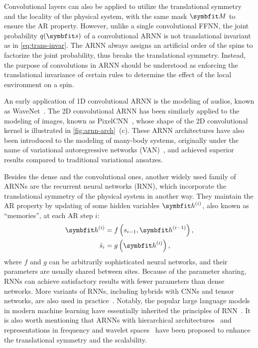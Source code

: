 Convolutional layers can also be applied to utilize the translational symmetry and the locality of the physical system, with the same mask $\mM$ to ensure the AR property. However, unlike a single convolutional FFNN, the joint probability $q(\vs)$ of a convolutional ARNN is not translational invariant as in \cref{eq:trans-invar}. The ARNN always assigns an artificial order of the spins to factorize the joint probability, thus breaks the translational symmetry. Instead, the purpose of convolutions in ARNN should be understood as enforcing the translational invariance of certain rules to determine the effect of the local environment on a spin.

An early application of 1D convolutional ARNN is the modeling of audios, known as WaveNet~\cite{oord2016wavenet}. The 2D convolutional ARNN has been similarly applied to the modeling of images, known as PixelCNN~\cite{oord2016pixel}, whose shape of the 2D convolutional kernel is illustrated in \cref{fig:arnn-arch}~(c). These ARNN architectures have also been introduced to the modeling of many-body systems, originally under the name of variational autoregressive networks (VAN)~\cite{wu2019solving}, and achieved superior results compared to traditional variational ansatzes.

Besides the dense and the convolutional ones, another widely used family of ARNNs are the recurrent neural networks (RNN), which incorporate the translational symmetry of the physical system in another way. They maintain the AR property by updating of some hidden variables $\vh^{(i)}$, also known as ``memories'', at each AR step $i$:
\begin{align}
\vh^{(i)} &= f\left( s_{i - 1}, \vh^{(i - 1)} \right), \\
\hat{s}_i &= g\left( \vh^{(i)} \right),
\end{align}
where $f$ and $g$ can be arbitrarily sophisticated neural networks, and their parameters are usually shared between sites. Because of the parameter sharing, RNNs can achieve satisfactory results with fewer parameters than dense networks. More variants of RNNs, including hybrids with CNNs and tensor networks, are also used in practice~\cite{oord2016pixel, khandoker2023supplementing}. Notably, the popular large language models in modern machine learning have essentially inherited the principles of RNN~\cite{brown2020language}. It is also worth mentioning that ARNNs with hierarchical architectures~\cite{bialas2022hierarchical} and representations in frequency and wavelet spaces~\cite{nash2021generating, mattar2024wavelets} have been proposed to enhance the translational symmetry and the scalability.

